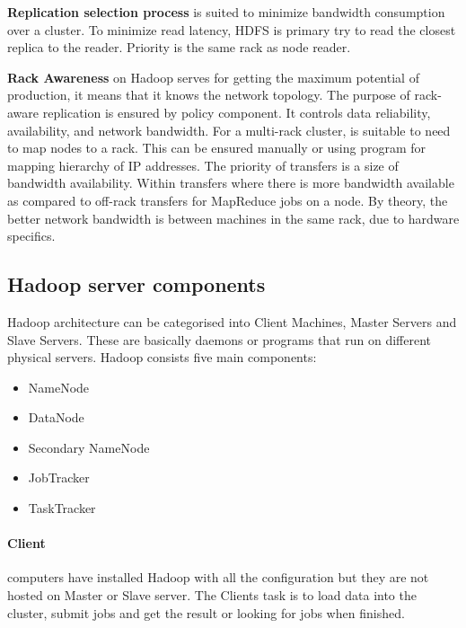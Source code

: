 \documentclass[a4paper,12pt,oneside]{report}
\begin{document}
\textbf{Replication selection process} is suited to minimize bandwidth consumption over a cluster. 
To minimize read latency, HDFS is primary try to read the closest replica to the reader. Priority is the 
same rack as node reader. \cite{hadoop_hdfs_web}

\textbf{Rack Awareness} on Hadoop serves for getting the maximum potential of production, 
it means that it knows the network topology. The purpose of rack-aware replication is ensured by policy 
component. It controls data reliability, availability, and network bandwidth. For a multi-rack cluster, is suitable to need to map 
nodes to a rack\cite{hadoop_rack_web}. This can be ensured manually or using program for mapping hierarchy of IP 
addresses. The priority of transfers is a size of bandwidth availability.  Within transfers 
where there is more bandwidth available as compared to off-rack transfers for MapReduce jobs on a node. 
By theory, the better network bandwidth is between machines in the same rack, due to hardware specifics.
		
		\subsection{Hadoop server components}
Hadoop architecture can be categorised into Client Machines, Master Servers and Slave Servers. These are basically daemons or programs that run on different physical servers. Hadoop consists five main components: 
\begin{itemize}[noitemsep]
\item NameNode
\item DataNode
\item Secondary NameNode
\item JobTracker
\item TaskTracker
\end{itemize}

\paragraph{Client}
computers have installed Hadoop with  all the configuration but they are not hosted on Master or Slave 
server. The Clients task is to  load data into the cluster, submit jobs and get the result or looking for jobs when finished.
		
\end{document}

